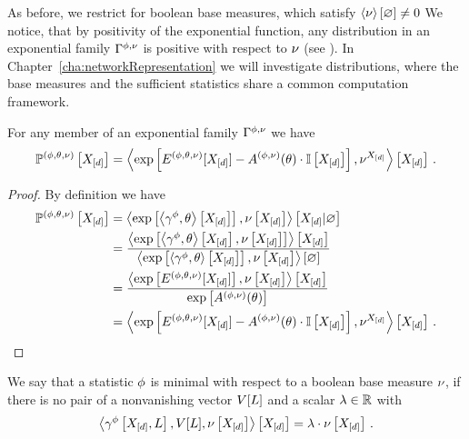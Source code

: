 As before, we restrict for boolean base measures, which satisfy $\left\langle \nu\right\rangle \left[ \varnothing \right]\neq0$
We notice, that by positivity of the exponential function, any distribution in an exponential family $\Gamma^{\phi,\nu}$ is positive with respect to $\nu$ (see ).
In Chapter~\ref{cha:networkRepresentation} we will investigate distributions, where the base measures and the sufficient statistics share a common computation framework.



\begin{lemma}\label{lem:energyCumulantRepresentation}
	For any member of an exponential family $\Gamma^{\phi,\nu}$ we have
		\[ \mathbb{P}^{(\phi,\theta,\nu)}\left[X_{[d]}\right] 
		= \left\langle \mathrm{exp}\left[ E^{(\phi,\theta,\nu)}[X_{[d]}] - A^{(\phi,\nu)}(\theta)\cdot \mathbb{I}\left[X_{[d]}\right]\right],\nu^{X_{[d]}}\right\rangle \left[ X_{[d]} \right] \, . \]
\end{lemma}
\begin{proof}
	By definition we have
	\begin{align*}
		\mathbb{P}^{(\phi,\theta,\nu)}\left[X_{[d]}\right] 
		&= \left\langle 
		\mathrm{exp}\left[\left\langle \gamma^{\phi},\theta\right\rangle \left[ X_{[d]} \right]\right],\nu\left[X_{[d]}\right]
		\right\rangle \left[ X_{[d]} | \varnothing \right] \\
		&= \frac{\left\langle \mathrm{exp}\left[\left\langle \gamma^{\phi},\theta\right\rangle \left[ X_{[d]} \right],\nu\left[X_{[d]}\right]\right]\right\rangle \left[ X_{[d]} \right]
			}{\left\langle \mathrm{exp}\left[\left\langle \gamma^{\phi},\theta	\right\rangle \left[ X_{[d]} \right]\right],\nu\left[X_{[d]}\right]\right\rangle \left[ \varnothing \right]} \\
		&=  \frac{
		\left\langle \mathrm{exp}\left[E^{(\phi,\theta,\nu)}[X_{[d]}]\right],\nu\left[X_{[d]}\right]\right\rangle \left[ X_{[d]} \right]
		}{
		\mathrm{exp}\left[A^{(\phi,\nu)}(\theta)\right]
		} \\
		& = \left\langle \mathrm{exp}\left[ E^{(\phi,\theta,\nu)}[X_{[d]}] - A^{(\phi,\nu)}(\theta)\cdot \mathbb{I}\left[X_{[d]}\right]\right],\nu^{X_{[d]}}\right\rangle \left[ X_{[d]} \right] \, . 
	\end{align*}
\end{proof}



\begin{definition}[Minimal]\label{def:minimalStatistics}
	We say that a statistic $\phi$ is minimal with respect to a boolean base measure $\nu$, if there is no pair of a nonvanishing vector $V[L]$ and a scalar $\lambda\in\mathbb{R}$ with
		\[ \left\langle \gamma^{\phi}\left[X_{[d]},L\right],V[L],\nu\left[X_{[d]}\right]\right\rangle \left[ X_{[d]} \right] = \lambda\cdot\nu\left[X_{[d]}\right] \, . \]
\end{definition}




